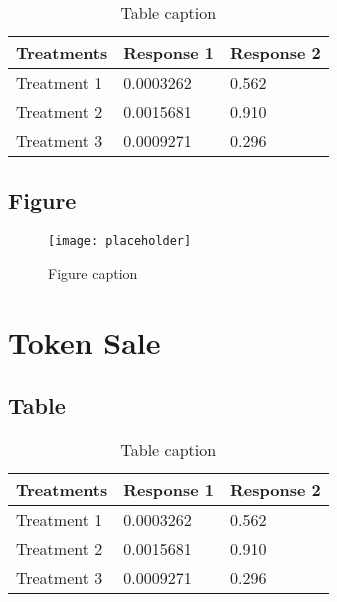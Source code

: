 \documentclass[11pt,fleqn]{book} %
\begin{document}
\begin{table}[h]
	\centering
	\begin{tabular}{l l l}
		\toprule
		\textbf{Treatments} & \textbf{Response 1} & \textbf{Response 2} \\
		\midrule
		Treatment 1         & 0.0003262           & 0.562               \\
		Treatment 2         & 0.0015681           & 0.910               \\
		Treatment 3         & 0.0009271           & 0.296               \\
		\bottomrule
	\end{tabular}
	\caption{Table caption}
\end{table}


\section{Figure}

\begin{figure}[h]
	\centering\texttt{[image: placeholder]}
	\caption{Figure caption}
\end{figure}




\chapter{Token Sale}

\section{Table}

\begin{table}[h]
	\centering
	\begin{tabular}{l l l}
		\toprule
		\textbf{Treatments} & \textbf{Response 1} & \textbf{Response 2} \\
		\midrule
		Treatment 1         & 0.0003262           & 0.562               \\
		Treatment 2         & 0.0015681           & 0.910               \\
		Treatment 3         & 0.0009271           & 0.296               \\
		\bottomrule
	\end{tabular}
	\caption{Table caption}
\end{table}
\end{document}
